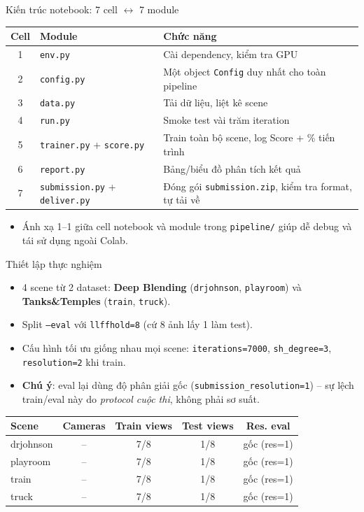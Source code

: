 \begin{frame}{Kiến trúc notebook: 7 cell $\leftrightarrow$ 7 module}
\footnotesize
\begin{table}
\centering
\begin{tabular}{cll}
\toprule
\textbf{Cell} & \textbf{Module} & \textbf{Chức năng} \\
\midrule
1 & \texttt{env.py} & Cài dependency, kiểm tra GPU \\
2 & \texttt{config.py} & Một object \texttt{Config} duy nhất cho toàn pipeline \\
3 & \texttt{data.py} & Tải dữ liệu, liệt kê scene \\
4 & \texttt{run.py} & Smoke test vài trăm iteration \\
5 & \texttt{trainer.py} + \texttt{score.py} & Train toàn bộ scene, log Score + \% tiến trình \\
6 & \texttt{report.py} & Bảng/biểu đồ phân tích kết quả \\
7 & \texttt{submission.py} + \texttt{deliver.py} & Đóng gói \texttt{submission.zip}, kiểm tra format, tự tải về \\
\bottomrule
\end{tabular}
\end{table}
\normalsize
\begin{itemize}
    \item Ánh xạ 1--1 giữa cell notebook và module trong \texttt{pipeline/} giúp dễ debug và tái sử dụng ngoài Colab.
\end{itemize}
\end{frame}

\begin{frame}{Thiết lập thực nghiệm}
\begin{itemize}
    \item 4 scene từ 2 dataset: \textbf{Deep Blending} (\texttt{drjohnson}, \texttt{playroom}) và \textbf{Tanks\&Temples} (\texttt{train}, \texttt{truck}).
    \item Split \texttt{--eval} với \texttt{llffhold=8} (cứ 8 ảnh lấy 1 làm test).
    \item Cấu hình tối ưu giống nhau mọi scene: \texttt{iterations=7000}, \texttt{sh\_degree=3}, \texttt{resolution=2} khi train.
    \item \textbf{Chú ý}: eval lại dùng độ phân giải gốc (\texttt{submission\_resolution=1}) -- sự lệch train/eval này do \emph{protocol cuộc thi}, không phải sơ suất.
\end{itemize}
\vspace{0.3em}
\footnotesize
\centering
\begin{tabular}{lcccc}
\toprule
\textbf{Scene} & \textbf{Cameras} & \textbf{Train views} & \textbf{Test views} & \textbf{Res. eval} \\
\midrule
drjohnson & -- & 7/8 & 1/8 & gốc (res=1) \\
playroom  & -- & 7/8 & 1/8 & gốc (res=1) \\
train     & -- & 7/8 & 1/8 & gốc (res=1) \\
truck     & -- & 7/8 & 1/8 & gốc (res=1) \\
\bottomrule
\end{tabular}
\end{frame}

